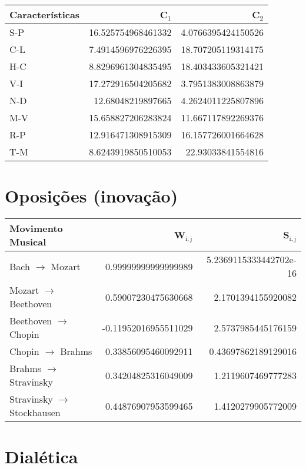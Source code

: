 \documentclass[11pt]{article}
\begin{document}
\begin{center}
\begin{tabular}{lrr}
 Características  &               C$_1$  &               C$_2$  \\
\hline
 S-P              &  16.525754968461332  &  4.0766395424150526  \\
 C-L              &  7.4914596976226395  &  18.707205119314175  \\
 H-C              &  8.8296961304835495  &  18.403433605321421  \\
 V-I              &  17.272916504205682  &  3.7951383008863879  \\
 N-D              &   12.68048219897665  &  4.2624011225807896  \\
 M-V              &  15.658827206283824  &  11.667117892269376  \\
 R-P              &  12.916471308915309  &  16.157726001664628  \\
 T-M              &  8.6243919850510053  &   22.93033841554816  \\
\end{tabular}
\end{center}
\section{Oposições (inovação)}
\label{sec-6}



\begin{center}
\begin{tabular}{lrr}
 Movimento Musical             &    W$_{\mathrm{i,j}}$  &      S$_{\mathrm{i,j}}$  \\
\hline
 Bach $\to$ Mozart             &   0.99999999999999989  &  5.2369115333442702e-16  \\
 Mozart $\to$ Beethoven        &   0.59007230475630668  &      2.1701394155920082  \\
 Beethoven $\to$ Chopin        &  -0.11952016955511029  &      2.5737985445176159  \\
 Chopin $\to$ Brahms           &   0.33856095460092911  &     0.43697862189129016  \\
 Brahms $\to$ Stravinsky       &   0.34204825316049009  &      1.2119607469777283  \\
 Stravinsky $\to$ Stockhausen  &   0.44876907953599465  &      1.4120279905772009  \\
\end{tabular}
\end{center}
\section{Dialética}
\label{sec-7}
\end{document}
